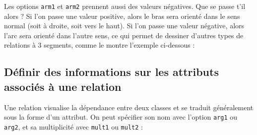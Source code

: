 \documentclass[a4paper,11pt]{report}
\newcommand{\inputTikZ}[1]{%
  }%
\newcommand{\inputTikZ}[1]{%
    \texttt{[image: fig/\#1.pdf]}%
  }%
\begin{document}
\begin{minipage}{0.5\textwidth}

\end{minipage}
\begin{minipage}{0.4\textwidth}
\begin{center}
\inputTikZ{figure11}
\end{center}
\end{minipage}

\medskip

\begin{minipage}{0.5\textwidth}

\end{minipage}
\begin{minipage}{0.4\textwidth}
\begin{center}
\inputTikZ{figure12}
\end{center}
\end{minipage}

\medskip

Les options {\tt arm1} et {\tt arm2} prennent aussi des valeurs négatives. Que se passe t'il alors ?
Si l'on passe une valeur positive, alors le bras sera orienté dans le sens normal (soit à droite, soit vers le haut). Si l'on passe une valeur négative, alors l'arc sera orienté dans l'autre sens, ce qui permet de dessiner d'autres types de relations à 3 segments, comme le montre l'exemple ci-dessous :

\medskip

\begin{minipage}{0.5\textwidth}

\end{minipage}
\begin{minipage}{0.4\textwidth}
\begin{center}
\inputTikZ{figure13}
\end{center}
\end{minipage}


\subsection{Définir des informations sur les attributs associés à une relation}

Une relation visualise la dépendance entre deux classes et se traduit généralement sous la forme d'un attribut. On peut spécifier son nom avec l'option {\tt arg1} ou {\tt arg2}, et sa multiplicité avec {\tt mult1} ou {\tt mult2} :

\medskip

\begin{minipage}{0.5\textwidth}

\end{minipage}
\begin{minipage}{0.4\textwidth}
\begin{center}
\inputTikZ{figure14}
\end{center}
\end{minipage}
\end{document}
